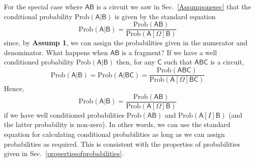 \documentclass[10pt]{article}
\begin{document}
For the special case where $\mathsf{AB}$ is a circuit we saw in Sec.\ \ref{Assumponesec} that the conditional probability $\text{Prob}(\mathsf{A|B})$ is given by the standard equation
\begin{equation}
\text{Prob}(\mathsf{A|B})=\frac{\text{Prob}(\mathsf{AB})}{\text{Prob}(\mathsf{A}[\Omega]\mathsf{B})}
\end{equation}
since, by {\bf Assump 1}, we can assign the probabilities given in the numerator and denominator.  What happens when $\mathsf{AB}$ is a fragment?  If we have a well conditioned probability $\text{Prob}(\mathsf{A|B})$ then, for any $\mathsf C$ such that $\mathsf{ABC}$ is a circuit,
\begin{equation}
\text{Prob}(\mathsf{A|B})= \text{Prob}(\mathsf{A|BC}) =\frac{\text{Prob}(\mathsf{ABC})}{\text{Prob}(\mathsf{A}[\Omega]\mathsf{BC})}
\end{equation}
Hence,
\begin{equation}
\text{Prob}(\mathsf{A|B})=\frac{\text{Prob}(\mathsf{AB})}{\text{Prob}(\mathsf{A}[\Omega]\mathsf{B})}
\end{equation}
if we have well conditioned probabilities $\text{Prob}(\mathsf{AB})$ and $\text{Prob}(\mathsf{A}[I]\mathsf{B})$ (and the latter probability is non-zero).   In other words, we can use the standard equation for calculating conditional probabilities as long as we can assign probabilities as required.   This is consistent with the properties of probabilities given in Sec.\ \ref{propertiesofprobabilities}.
\end{document}
